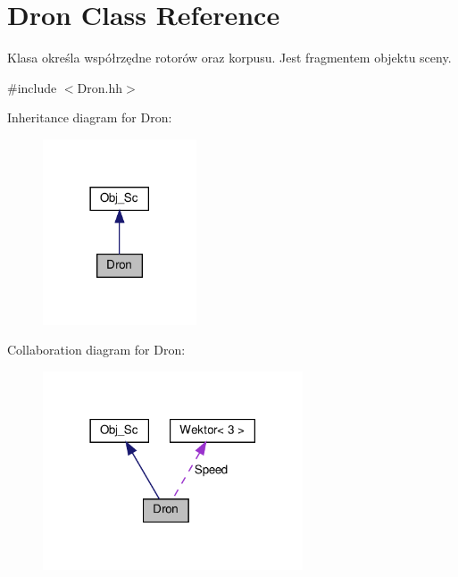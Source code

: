 \hypertarget{class_dron}{}\section{Dron Class Reference}
\label{class_dron}


Klasa określa współrzędne rotorów oraz korpusu. Jest fragmentem objektu sceny.  




{\ttfamily \#include $<$Dron.\+hh$>$}



Inheritance diagram for Dron\+:
\nopagebreak
\begin{figure}[H]
\begin{center}
\leavevmode
\includegraphics[width=129pt]{class_dron__inherit__graph}
\end{center}
\end{figure}


Collaboration diagram for Dron\+:
\nopagebreak
\begin{figure}[H]
\begin{center}
\leavevmode
\includegraphics[width=218pt]{class_dron__coll__graph}
\end{center}
\end{figure}
